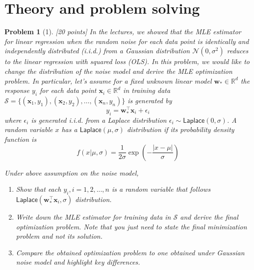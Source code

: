\documentclass[11pt]{article}
\theoremstyle{quest}
\newtheorem*{problem}{Problem}
\begin{document}
\section*{Theory and problem solving}
\begin{problem}[1]
[20 points] In the lectures, we showed that the MLE estimator for linear regression when the random noise for each data point is identically and independently distributed (i.i.d.) from a Gaussian distribution $\mathcal{N}(0, \sigma^2)$ reduces to the linear regression with squared loss (OLS). In this problem, we would like to change the distribution of the noise model and derive the MLE optimization problem. In particular, let’s assume for a fixed unknown linear model $\bm{w}_{\ast} \in \mathbb{R}^d$ the response $y_i$ for each data point $\bm{x}_{i} \in \mathbb{R}^d$ in training data $\mathcal{S} = \{(\bm{x}_{1}, y_1),(\bm{x}_{2}, y_2),\dots,(\bm{x}_{n}, y_n)\}$ is generated by
\begin{equation*}
  y_i = \bm{w}_{\ast}^{\top}\bm{x}_i + \epsilon_i
\end{equation*}
where $\epsilon_i$ is generated i.i.d. from a Laplace distribution $\epsilon_i \sim \textsf{Laplace}(0, \sigma)$.
A random variable $x$ has a $\textsf{Laplace}(\mu,\sigma)$ distribution if its probability density function is
\begin{equation*}
    f(x|\mu,\sigma) = \frac{1}{2\sigma}\exp(-\frac{|x-\mu|}{\sigma})
\end{equation*}

Under above assumption on the noise model,
\begin{enumerate}
    \item Show that each $y_i, i = 1, 2, . . . , n$ is a random variable that follows $\textsf{Laplace}(\bm{w}_{\ast}^{\top}\bm{x}_i, \sigma)$ distribution.
    \item Write down the MLE estimator for training data in $\mathcal{S}$ and derive the final optimization problem. Note that you just need to state the final minimization problem and not its solution.
    \item Compare the obtained optimization problem to one obtained under Gaussian noise model and highlight key differences.
\end{enumerate}
\end{problem}
\end{document}
